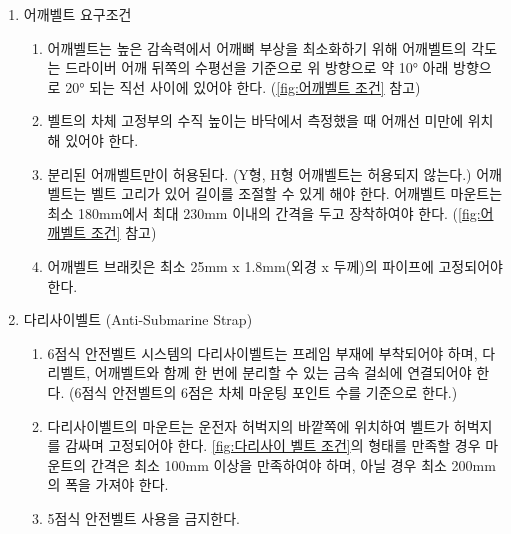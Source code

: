 \documentclass[final,a4paper,10pt]{report}
\begin{document}
\begin{enumerate}
\begin{enumerate}
      \end{enumerate}
    \item 어깨벨트 요구조건
      \begin{enumerate}
        \item 어깨벨트는 높은 감속력에서 어깨뼈 부상을 최소화하기 위해 어깨벨트의 각도는 드라이버 어깨 뒤쪽의 수평선을 기준으로 위 방향으로 약 10° 아래 방향으로 20° 되는 직선 사이에 있어야 한다. (\cref{fig:어깨벨트 조건} 참고)
        \item 벨트의 차체 고정부의 수직 높이는 바닥에서 측정했을 때 어깨선 미만에 위치해 있어야 한다.
        \item 분리된 어깨벨트만이 허용된다. (Y형, H형 어깨벨트는 허용되지 않는다.) 어깨벨트는 벨트 고리가 있어 길이를 조절할 수 있게 해야 한다. 어깨벨트 마운트는 최소 180mm에서 최대 230mm 이내의 간격을 두고 장착하여야 한다. (\cref{fig:어깨벨트 조건} 참고)
        \item 어깨벨트 브래킷은 최소 25mm x 1.8mm(외경 x 두께)의 파이프에 고정되어야 한다.
        
      \end{enumerate}
    \item 다리사이벨트 (Anti-Submarine Strap)
      \begin{enumerate}
        \item 6점식 안전벨트 시스템의 다리사이벨트는 프레임 부재에 부착되어야 하며, 다리벨트, 어깨벨트와 함께 한 번에 분리할 수 있는 금속 걸쇠에 연결되어야 한다. (6점식 안전벨트의 6점은 차체 마운팅 포인트 수를 기준으로 한다.)
        \item 다리사이벨트의 마운트는 운전자 허벅지의 바깥쪽에 위치하여 벨트가 허벅지를 감싸며 고정되어야 한다. \cref{fig:다리사이 벨트 조건}의 형태를 만족할 경우 마운트의 간격은 최소 100mm 이상을 만족하여야 하며, 아닐 경우 최소 200mm의 폭을 가져야 한다.
        \item 5점식 안전벨트 사용을 금지한다.
        
      \end{enumerate}
  \end{enumerate}
\end{document}
